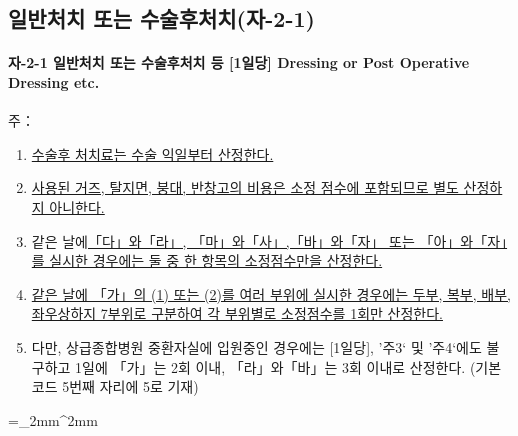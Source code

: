 \subsection{일반처치 또는 수술후처치(자-2-1)} 
\paragraph{자-2-1 일반처치 또는 수술후처치 등 [1일당] Dressing or Post Operative Dressing etc.}
주：
\begin{enumerate}[1.]\tightlist
\item \uline{수술후 처치료는 수술 익일부터 산정한다.}
\item \uline{사용된 거즈, 탈지면, 붕대, 반창고의 비용은 소정 점수에 포함되므로 별도 산정하지 아니한다.}
\item 같은 날에\uline{「다」와「라」, 「마」와「사」,「바」와「자」 또는 「아」와「자」를 실시한 경우에는 둘 중 한 항목의 소정점수만을 산정한다.}
\item \uline{같은 날에 「가」의 (1) 또는 (2)를 여러 부위에 실시한 경우에는 두부, 복부, 배부, 좌\cntrdot{}우\cntrdot{}상\cntrdot{}하지 7부위로 구분하여 각 부위별로 소정점수를 1회만 산정한다.}
\item 다만, 상급종합병원 중환자실에 입원중인 경우에는 [1일당], ’주3‘ 및 ’주4‘에도 불구하고 1일에
「가」는 2회 이내, 「라」와「바」는 3회 이내로 산정한다. (기본코드 5번째 자리에 5로 기재)
\end{enumerate}
\tabulinesep =_2mm^2mm
